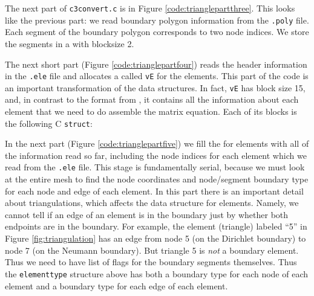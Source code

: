 
The next part of \texttt{c3convert.c} is in Figure \ref{code:trianglepartthree}.  This looks like the previous part: we read boundary polygon information from the \texttt{.poly} file.  Each segment of the boundary polygon corresponds to two node indices.  We store the segments in a \pVec with blocksize 2.


The next short part (Figure \ref{code:trianglepartfour}) reads the header information in the \texttt{.ele} file and allocates a \pVec called \texttt{vE} for the elements.  This part of the code is an important transformation of the data structures.  In fact, \texttt{vE} has block size 15, and, in contrast to the format from \Triangle, it contains all the information about each element that we need to do assemble the matrix equation.  Each of its blocks is the following C \texttt{struct}:
\newcommand*\FancyVerbStartString{//STARTSTRUCT}
\newcommand*\FancyVerbStopString{//ENDSTRUCT}
\let\FancyVerbStartString\relax
\let\FancyVerbStopString\relax


In the next part (Figure \ref{code:trianglepartfive}) we fill the \pVec for elements with all of the information read so far, including the node indices for each element which we read from the \texttt{.ele} file.  This stage is fundamentally serial, because we must look at the entire mesh to find the node coordinates and node/segment boundary type for each node and edge of each element.  In this part there is an important detail about triangulations, which affects the data structure for elements.  Namely, we cannot tell if an edge of an element is in the boundary just by whether both endpoints are in the boundary.  For example, the element (triangle) labeled ``5'' in Figure \ref{fig:triangulation} has an edge from node 5 (on the Dirichlet boundary) to node 7 (on the Neumann boundary).  But triangle 5 is \emph{not} a boundary element.  Thus we need to have list of flags for the boundary segments themselves.  Thus the \texttt{elementtype} structure above has both a boundary type for each node of each element and a boundary type for each edge of each element.

